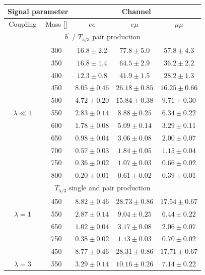 \begin{table}[p]
  \begin{center}
    \begin{tabular}{c|c|c|c|c}
      \hline\hline
      \multicolumn{2}{c|}{Signal parameter}  & \multicolumn{3}{c}{Channel} \\
      \hline
      Coupling& Mass [\GeV{}]      & $ee$ & $e\mu$ & $\mu\mu$ \\ 
      \hline
      \multicolumn{5}{c}{$b^\prime$ / $T_{5/3}$ pair production} \\
      \hline
      & 300 & $16.8 \pm 2.2$   & $77.8 \pm 5.0$   & $57.8 \pm 4.3$     \\ 
      & 350 & $16.8 \pm 1.4$   & $64.5 \pm 2.9$   & $36.2 \pm 2.2$     \\ 
      & 400 & $12.3 \pm 0.8$   & $41.9 \pm 1.5$   & $28.2 \pm 1.3$     \\ 
      & 450 & $8.05 \pm 0.46$   & $26.18 \pm 0.85$   & $16.25 \pm 0.66$     \\ 
      & 500 & $4.72 \pm 0.20$   & $15.84 \pm 0.38$   & $9.71 \pm 0.30$     \\ 
      $\lambda\ll1$ & 550 & $2.83 \pm 0.14$   & $8.88 \pm 0.25$   & $6.34 \pm 0.22$     \\ 
      & 600 & $1.78 \pm 0.08$   & $5.09 \pm 0.14$   & $3.29 \pm 0.11$     \\ 
      & 650 & $0.98 \pm 0.04$   & $3.06 \pm 0.08$   & $2.00 \pm 0.07$     \\ 
      & 700 & $0.57 \pm 0.03$   & $1.84 \pm 0.05$   & $1.15 \pm 0.04$     \\ 
      & 750 & $0.36 \pm 0.02$   & $1.07 \pm 0.03$   & $0.66 \pm 0.02$     \\ 
      & 800 & $0.20 \pm 0.01$   & $0.61 \pm 0.02$   & $0.39 \pm 0.01$     \\ 
      \hline
      \multicolumn{5}{c}{$T_{5/3}$ single and pair production} \\
      \hline
      & 450 & $8.82 \pm 0.46$ & $28.73 \pm 0.86$ & $17.54 \pm 0.67$ \\
      $\lambda=1$ & 550 & $2.87 \pm 0.14$ & $9.04  \pm 0.25$ & $6.44  \pm 0.22$ \\
      & 650 & $1.02 \pm 0.04$ & $3.17  \pm 0.08$ & $2.06  \pm 0.07$ \\
      & 750 & $0.38 \pm 0.02$ & $1.13  \pm 0.03$ & $0.70  \pm 0.02$ \\
      \hline
      & 450 & $8.77 \pm 0.46$ & $28.31 \pm 0.86$ & $17.71 \pm 0.67$ \\
      $\lambda=3$ & 550 & $3.29 \pm 0.14$ & $10.16  \pm 0.26$ & $7.14  \pm 0.22$ \\

\end{tabular}
\end{center}
\end{table}

